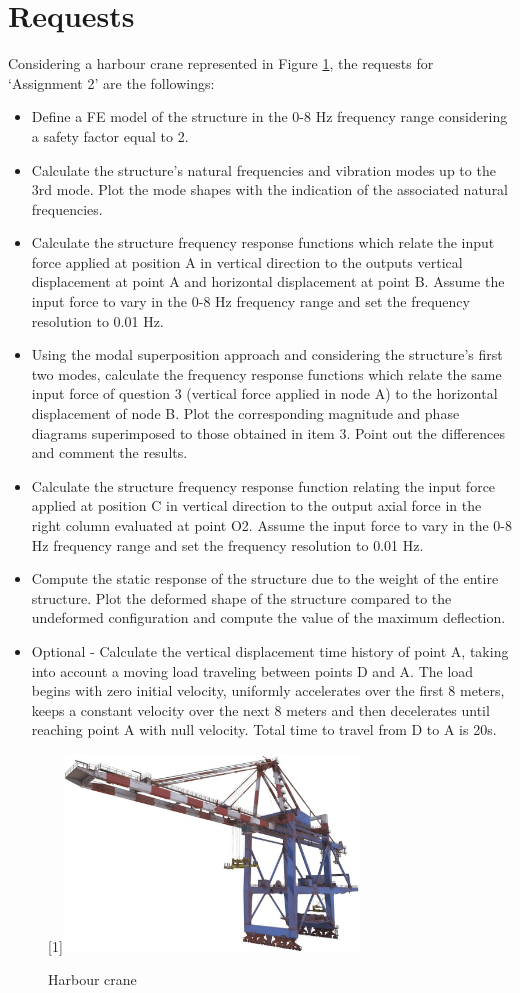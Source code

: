 \section{Requests}
\label{sec:requests}

Considering a harbour crane represented in Figure \ref{fig:harbour-crane}, the requests for `Assignment 2' are the followings:

\begin{itemize}
    \item Define a FE model of the structure in the 0-8 Hz frequency range considering a safety factor equal to 2.
    \item Calculate the structure's natural frequencies and vibration modes up to the 3rd mode. Plot the mode shapes with the indication of the associated natural frequencies.
    \item Calculate the structure frequency response functions which relate the input force applied at position A in vertical direction to the outputs vertical displacement at point A and horizontal displacement at point B. Assume the input force to vary in the 0-8 Hz frequency range and set the frequency resolution to 0.01 Hz.
    \item Using the modal superposition approach and considering the structure's first two modes, calculate the frequency response functions which relate the same input force of question 3 (vertical force applied in node A) to the horizontal displacement of node B. Plot the corresponding magnitude and phase diagrams superimposed to those obtained in item 3. Point out the differences and comment the results.
    \item Calculate the structure frequency response function relating the input force applied at position C in vertical direction to the output axial force in the right column evaluated at point O2. Assume the input force to vary in the 0-8 Hz frequency range and set the frequency resolution to 0.01 Hz.
    \item Compute the static response of the structure due to the weight of the entire structure. Plot the deformed shape of the structure compared to the undeformed configuration and compute the value of the maximum deflection.
    \item Optional - Calculate the vertical displacement time history of point A, taking into account a moving load traveling between points D and A. The load begins with zero initial velocity, uniformly accelerates over the first 8 meters, keeps a constant velocity over the next 8 meters and then decelerates until reaching point A with null velocity. Total time to travel from D to A is 20s.
\end{itemize}

\begin{figure}[H]
    \centering
    \scalebox{-1}[1]{\includegraphics[width=0.7\textwidth]{img/harbour-crane-image.jpeg}}
    \caption{Harbour crane}
    \label{fig:harbour-crane}
\end{figure}